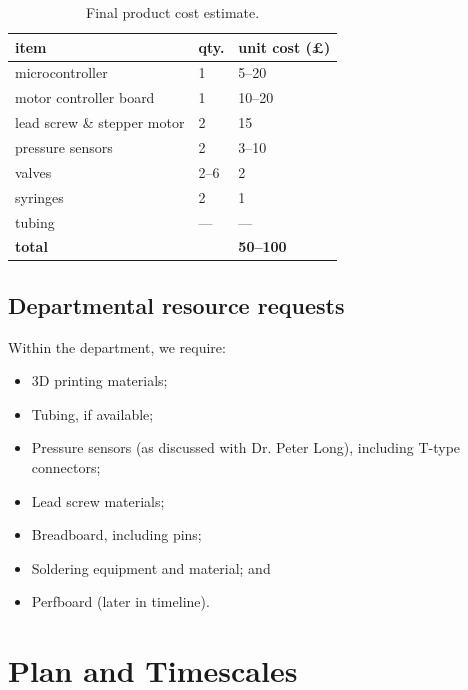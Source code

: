 \documentclass[10pt, a4paper]{article}
\begin{document}
\begin{table}[H]
    \small
    \centering
    \begin{tabular}{lll}
        \toprule
        \textbf{item}               & \textbf{qty.} & \textbf{unit cost (£)} \\
        \midrule
        microcontroller             & 1             & 5--20                  \\
        motor controller board      & 1             & 10--20                 \\
        lead screw \& stepper motor & 2             & 15                     \\
        pressure sensors            & 2             & 3--10                  \\
        valves                      & 2--6          & 2                      \\
        syringes                    & 2             & 1                      \\
        tubing                      & ---           & ---                    \\
        \midrule
        \textbf{total}              &               & \textbf{50--100}       \\
        \bottomrule
    \end{tabular}
    \caption{Final product cost estimate.}
\end{table}

\subsection{Departmental resource requests}
Within the department, we require:

\begin{itemize}[noitemsep]
    \item 3D printing materials;
    \item Tubing, if available;
    \item Pressure sensors (as discussed with Dr. Peter Long), including T-type connectors;
    \item Lead screw materials;
    \item Breadboard, including pins;
    \item Soldering equipment and material; and
    \item Perfboard (later in timeline).
\end{itemize}

\section{Plan and Timescales}
\end{document}

